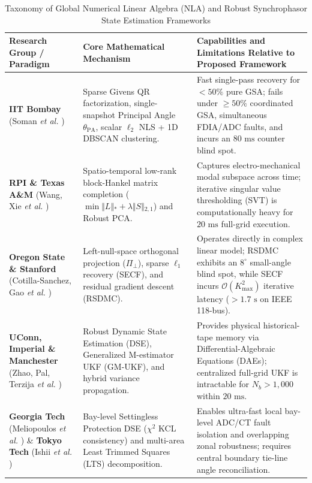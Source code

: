 \documentclass[journal,twoside]{IEEEtran}
\begin{document}
\begin{table}[!t]
\centering
\footnotesize
\caption{Taxonomy of Global Numerical Linear Algebra (NLA) and Robust Synchrophasor State Estimation Frameworks}
\label{tab:taxonomy}
\begin{tabular}{p{3.6cm}p{5.2cm}p{8.0cm}}
\toprule
\textbf{Research Group / Paradigm} & \textbf{Core Mathematical Mechanism} & \textbf{Capabilities and Limitations Relative to Proposed Framework} \\
\midrule
\textbf{IIT Bombay} (Soman \emph{et al.} \cite{pandian1999towards,soman2002computational,minal2019pmu,minal2020realtime,raju2023mitigation,badugu2026synchrophasor}) & Sparse Givens QR factorization, single-snapshot Principal Angle $\theta_{\mathrm{PA}}$, scalar $\ell_2$ NLS + 1D DBSCAN clustering. & Fast single-pass recovery for $<50\%$ pure GSA; fails under $\ge 50\%$ coordinated GSA, simultaneous FDIA/ADC faults, and incurs an $80\text{~ms}$ counter blind spot. \\
\addlinespace[2pt]
\textbf{RPI \& Texas A\&M} (Wang, Xie \emph{et al.} \cite{gao2016missing,hao2018modelless}) & Spatio-temporal low-rank block-Hankel matrix completion ($\min \Vert{}L\Vert{}_* + \lambda\Vert{}S\Vert{}_{2,1}$) and Robust PCA. & Captures electro-mechanical modal subspace across time; iterative singular value thresholding (SVT) is computationally heavy for $20\text{~ms}$ full-grid execution. \\
\addlinespace[2pt]
\textbf{Oregon State \& Stanford} (Cotilla-Sanchez, Gao \emph{et al.} \cite{chauhan2021synchrophasor,desilva2021pmu}) & Left-null-space orthogonal projection ($\Pi_\perp$), sparse $\ell_1$ recovery (SECF), and residual gradient descent (RSDMC). & Operates directly in complex linear model; RSDMC exhibits an $8^\circ$ small-angle blind spot, while SECF incurs $\mathcal{O}(K_{\max}^2)$ iterative latency ($>1.7\text{~s}$ on IEEE 118-bus). \\
\addlinespace[2pt]
\textbf{UConn, Imperial \& Manchester} (Zhao, Pal, Terzija \emph{et al.} \cite{jin2019analysis,zhao2019power,zhao2018robust}) & Robust Dynamic State Estimation (DSE), Generalized M-estimator UKF (GM-UKF), and hybrid variance propagation. & Provides physical historical-tape memory via Differential-Algebraic Equations (DAEs); centralized full-grid UKF is intractable for $N_b > 1,000$ within $20\text{~ms}$. \\
\addlinespace[2pt]
\textbf{Georgia Tech} (Meliopoulos \emph{et al.} \cite{meliopoulos2017dynamic}) \& \textbf{Tokyo Tech} (Ishii \emph{et al.} \cite{chakhchoukh2021power}) & Bay-level Settingless Protection DSE ($\chi^2$ KCL consistency) and multi-area Least Trimmed Squares (LTS) decomposition. & Enables ultra-fast local bay-level ADC/CT fault isolation and overlapping zonal robustness; requires central boundary tie-line angle reconciliation. \\

\end{tabular}
\end{table}
\end{document}
